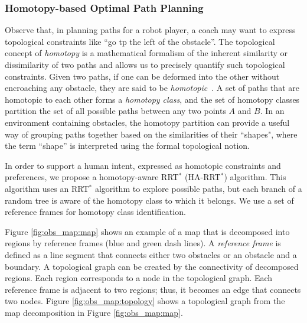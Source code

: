 \documentclass[phd]{byuprop}
\begin{document}
\subsubsection{Homotopy-based Optimal Path Planning}
\label{sec:project_description:homotopy_based_path_planning}

Observe that, in planning paths for a robot player, a coach may want to express topological constraints like ``go tp the left of the obstacle''.
The topological concept of \emph{homotopy} is a mathematical formalism of the inherent similarity or dissimilarity of two paths and allows us to precisely quantify such topological constraints.
Given two paths, if one can be deformed into the other without encroaching any obstacle, they are said to be \emph{homotopic}~\cite{Hernandez2015}.
A set of paths that are homotopic to each other forms a \emph{homotopy class}, and the  set of homotopy classes partition the set of all possible paths between any two points $A$ and $B$.
In an environment containing obstacles, the homotopy partition can provide a useful way of grouping paths together based on the similarities of their ``shapes", where the term ``shape'' is interpreted using the formal topological notion.

In order to support a human intent, expressed as homotopic constraints and preferences, we propose a homotopy-aware RRT$^{*}$ (HA-RRT$^{*}$) algorithm. 
This algorithm uses an RRT$^*$ algorithm to explore possible paths, but each branch of a random tree is aware of the homotopy class to which it belongs. 
We use a set of reference frames for homotopy class identification.

Figure \ref{fig:obs_map:map} shows an example of a map that is decomposed into regions by reference frames (blue and green dash lines).
A \emph{reference frame} is defined as a line segment that connects either two obstacles or an obstacle and a boundary.
A topological graph can be created by the connectivity of decomposed regions.
Each region corresponds to a node in the topological graph.
Each reference frame is adjacent to two regions; thus, it becomes an edge that connects two nodes.
Figure \ref{fig:obs_map:topology} shows a topological graph from the map decomposition in Figure \ref{fig:obs_map:map}.
\end{document}
